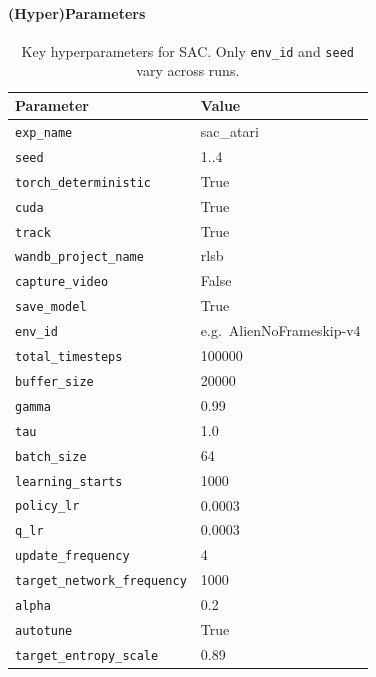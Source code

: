 \paragraph{(Hyper)Parameters}

\begin{table}[htbp]
	\caption{Key hyperparameters for SAC. Only \texttt{env\_id} and \texttt{seed} vary across runs.}
	\label{tab:sac_hyperparams}
	\centering
	\begin{tabular}{ll}
		\toprule
		\textbf{Parameter} & \textbf{Value} \\
		\midrule
		\texttt{exp\_name}              & sac\_atari \\
		\texttt{seed}                   & 1..4 \\
		\texttt{torch\_deterministic}   & True \\
		\texttt{cuda}                   & True \\
		\texttt{track}                  & True \\
		\texttt{wandb\_project\_name}   & rlsb \\
		\texttt{capture\_video}         & False \\
		\texttt{save\_model}            & True \\
		\texttt{env\_id}                & e.g.\ AlienNoFrameskip-v4 \\
		\texttt{total\_timesteps}       & 100000 \\
		\texttt{buffer\_size}           & 20000 \\
		\texttt{gamma}                  & 0.99 \\
		\texttt{tau}                    & 1.0 \\
		\texttt{batch\_size}            & 64 \\
		\texttt{learning\_starts}       & 1000 \\
		\texttt{policy\_lr}             & 0.0003 \\
		\texttt{q\_lr}                  & 0.0003 \\
		\texttt{update\_frequency}      & 4 \\
		\texttt{target\_network\_frequency} & 1000 \\
		\texttt{alpha}                  & 0.2 \\
		\texttt{autotune}               & True \\
		\texttt{target\_entropy\_scale} & 0.89 \\
		\bottomrule
	\end{tabular}
\end{table}

